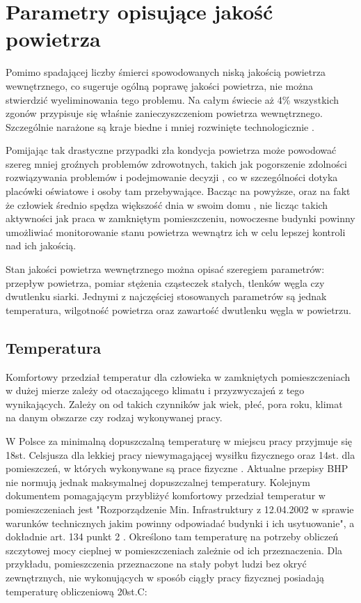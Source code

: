 
\section{Parametry opisujące jakość powietrza}
\label{opis-parametrow}

Pomimo spadającej liczby śmierci spowodowanych niską jakością powietrza 
wewnętrznego, co sugeruje ogólną poprawę jakości powietrza, nie można 
stwierdzić wyeliminowania tego problemu. Na całym świecie aż 4\% wszystkich 
zgonów przypisuje się właśnie zanieczyszczeniom powietrza wewnętrznego. 
Szczególnie narażone są kraje biedne i mniej rozwinięte technologicznie \cite{owid}.

Pomijając tak drastyczne przypadki zła kondycja powietrza może powodować szereg mniej 
groźnych problemów zdrowotnych, takich jak pogorszenie zdolności rozwiązywania 
problemów i podejmowanie decyzji \cite{co2-effects}, co w szczególności dotyka placówki oświatowe i 
osoby tam przebywające. Bacząc na powyższe, oraz na fakt że człowiek średnio spędza większość dnia w swoim 
domu \cite{time-indoors}, nie licząc takich aktywności jak praca w zamkniętym pomieszczeniu, nowoczesne 
budynki powinny umożliwiać monitorowanie stanu powietrza wewnątrz 
ich w celu lepszej kontroli nad ich jakością.

Stan jakości powietrza wewnętrznego można opisać szeregiem parametrów: przepływ powietrza, 
pomiar stężenia cząsteczek stałych, tlenków węgla czy dwutlenku siarki. Jednymi z 
najczęściej stosowanych parametrów są jednak temperatura, wilgotność powietrza oraz 
zawartość dwutlenku węgla w powietrzu. 

\subsection{Temperatura}

Komfortowy przedział temperatur dla człowieka w zamkniętych pomieszczeniach w dużej 
mierze zależy od otaczającego klimatu i przyzwyczajeń z tego wynikających. Zależy on od takich czynników 
jak wiek, płeć, pora roku, klimat na danym obszarze czy rodzaj wykonywanej pracy.

W Polsce za minimalną dopuszczalną temperaturę w miejscu pracy przyjmuje się 18st. Celsjusza dla 
lekkiej pracy niewymagającej wysiłku fizycznego oraz 14st. dla pomieszczeń, w których wykonywane są prace 
fizyczne \cite{manutan-bhp}. Aktualne przepisy BHP nie normują jednak maksymalnej dopuszczalnej temperatury. 
Kolejnym dokumentem pomagającym przybliżyć komfortowy przedział temperatur w pomieszczeniach jest
"Rozporządzenie Min. Infrastruktury z 12.04.2002 w sprawie warunków technicznych jakim powinny odpowiadać 
budynki i ich usytuowanie", a dokładnie art. 134 punkt 2 \cite{rozp-bud}. Określono tam temperaturę na potrzeby obliczeń szczytowej 
mocy cieplnej w pomieszczeniach zależnie od ich przeznaczenia.
Dla przykładu, pomieszczenia przeznaczone na stały pobyt ludzi bez okryć zewnętrznych, nie wykonujących 
w sposób ciągły pracy fizycznej posiadają temperaturę obliczeniową 20st.C:

